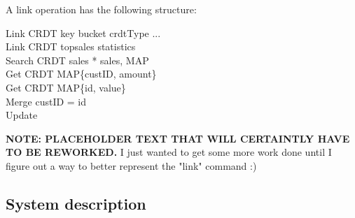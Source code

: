 \documentclass{vldb}
\begin{document}
A link operation has the following structure:


Link CRDT key bucket crdtType ...
\\
Link CRDT topsales statistics \\
	Search CRDT sales * sales, MAP \\
	Get CRDT MAP\{custID, amount\} \\
	Get CRDT MAP\{id, value\} \\
	Merge custID = id \\
	Update 
	

\textbf{NOTE: PLACEHOLDER TEXT THAT WILL CERTAINTLY HAVE TO BE REWORKED.} I just wanted to get some more work done until I figure out a way to better represent the "link" command :)



\subsection{System description}



\null\newpage\null

\null\newpage\null
\end{document}

